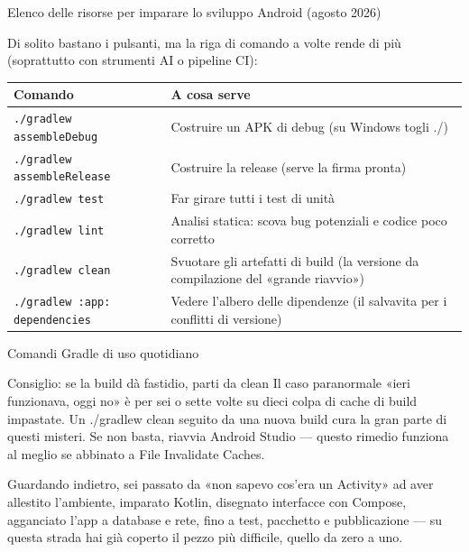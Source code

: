 \begin{center}\small\color{gray}Elenco delle risorse per imparare lo sviluppo Android (agosto 2026)\end{center}


Di solito bastano i pulsanti, ma la riga di comando a volte rende di più (soprattutto con strumenti AI o pipeline CI):

\begin{center}
\begin{tabularx}{\linewidth}{|X|X|}
\hline
\textbf{Comando} & \textbf{A cosa serve} \tabularnewline
\hline
\texttt{.\allowbreak /\allowbreak gradlew assembleDebug} & Costruire un APK di debug (su Windows togli ./) \tabularnewline
\texttt{.\allowbreak /\allowbreak gradlew assembleRelease} & Costruire la release (serve la firma pronta) \tabularnewline
\texttt{.\allowbreak /\allowbreak gradlew test} & Far girare tutti i test di unità \tabularnewline
\texttt{.\allowbreak /\allowbreak gradlew lint} & Analisi statica: scova bug potenziali e codice poco corretto \tabularnewline
\texttt{.\allowbreak /\allowbreak gradlew clean} & Svuotare gli artefatti di build (la versione da compilazione del «grande riavvio») \tabularnewline
\texttt{.\allowbreak /\allowbreak gradlew :app: dependencies} & Vedere l'albero delle dipendenze (il salvavita per i conflitti di versione) \tabularnewline
\hline
\end{tabularx}
\end{center}

\begin{center}\small\color{gray}Comandi Gradle di uso quotidiano\end{center}

\begin{tcbinfo}{Consiglio: se la build dà fastidio, parti da clean}
Il caso paranormale «ieri funzionava, oggi no» è per sei o sette volte su dieci colpa di cache di build impastate. Un ./gradlew clean seguito da una nuova build cura la gran parte di questi misteri. Se non basta, riavvia Android Studio — questo rimedio funziona al meglio se abbinato a File Invalidate Caches.

\end{tcbinfo}



Guardando indietro, sei passato da «non sapevo cos'era un Activity» ad aver allestito l'ambiente, imparato Kotlin, disegnato interfacce con Compose, agganciato l'app a database e rete, fino a test, pacchetto e pubblicazione — su questa strada hai già coperto il pezzo più difficile, quello da zero a uno.

